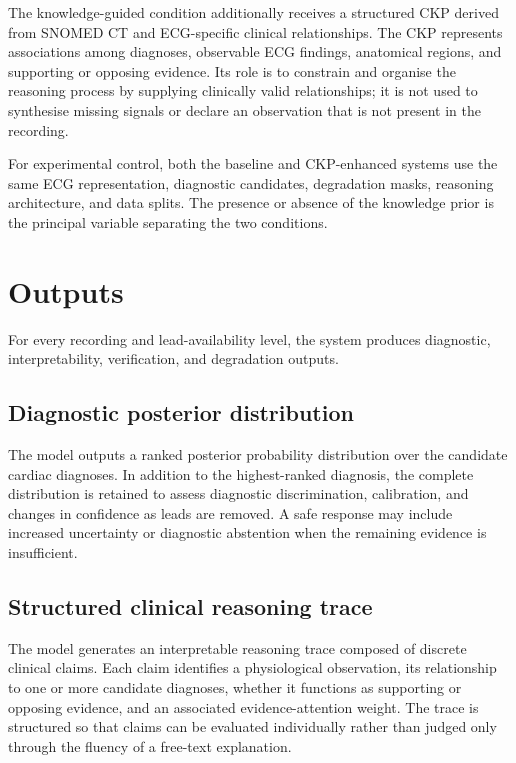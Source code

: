 \documentclass{ssnreview}
\begin{document}
The knowledge-guided condition additionally receives a structured CKP derived from
SNOMED CT and ECG-specific clinical relationships. The CKP represents associations among
diagnoses, observable ECG findings, anatomical regions, and supporting or opposing evidence.
Its role is to constrain and organise the reasoning process by supplying clinically valid
relationships; it is not used to synthesise missing signals or declare an observation that is
not present in the recording.

For experimental control, both the baseline and CKP-enhanced systems use the same ECG
representation, diagnostic candidates, degradation masks, reasoning architecture, and data
splits. The presence or absence of the knowledge prior is the principal variable separating
the two conditions.

\section{Outputs}

For every recording and lead-availability level, the system produces diagnostic,
interpretability, verification, and degradation outputs.

\subsection{Diagnostic posterior distribution}

The model outputs a ranked posterior probability distribution over the candidate cardiac
diagnoses. In addition to the highest-ranked diagnosis, the complete distribution is retained
to assess diagnostic discrimination, calibration, and changes in confidence as leads are
removed. A safe response may include increased uncertainty or diagnostic abstention when
the remaining evidence is insufficient.

\subsection{Structured clinical reasoning trace}

The model generates an interpretable reasoning trace composed of discrete clinical claims.
Each claim identifies a physiological observation, its relationship to one or more candidate
diagnoses, whether it functions as supporting or opposing evidence, and an associated
evidence-attention weight. The trace is structured so that claims can be evaluated
individually rather than judged only through the fluency of a free-text explanation.
\end{document}
